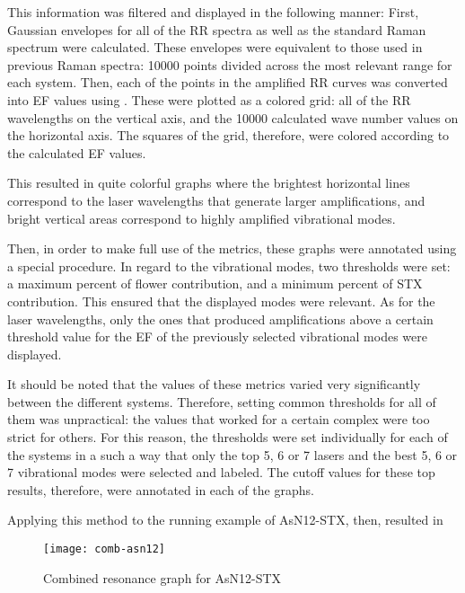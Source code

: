 This information was filtered and displayed in the following manner:
First, Gaussian envelopes for all of the RR spectra as well as the standard Raman spectrum were calculated.
These envelopes were equivalent to those used in previous Raman spectra: \num{10000} points divided across the most relevant range for each system.
Then, each of the points in the amplified RR curves was converted into EF values using .
These were plotted as a colored grid: all of the RR wavelengths on the vertical axis, and the \num{10000} calculated wave number values on the horizontal axis.
The squares of the grid, therefore, were colored according to the calculated EF values.

This resulted in quite colorful graphs where the brightest horizontal lines correspond to the laser wavelengths that generate larger amplifications, and bright vertical areas correspond to highly amplified vibrational modes.

Then, in order to make full use of the metrics, these graphs were annotated using a special procedure.
In regard to the vibrational modes, two thresholds were set: a maximum percent of flower contribution, and a minimum percent of STX contribution.
This ensured that the displayed modes were relevant.
As for the laser wavelengths, only the ones that produced amplifications above a certain threshold value for the EF of the previously selected vibrational modes were displayed.

It should be noted that the values of these metrics varied very significantly between the different systems.
Therefore, setting common thresholds for all of them was unpractical: the values that worked for a certain complex were too strict for others.
For this reason, the thresholds were set individually for each of the systems in a such a way that only the top 5, 6 or 7 lasers and the best 5, 6 or 7 vibrational modes were selected and labeled.
The cutoff values for these top results, therefore, were annotated in each of the graphs.

Applying this method to the running example of AsN12-STX, then, resulted in 

\begin{figure}
    \texttt{[image: comb-asn12]}
    \caption[Combined resonance graph for AsN12-STX]{Combined resonance graph for AsN12-STX}
\end{figure}

